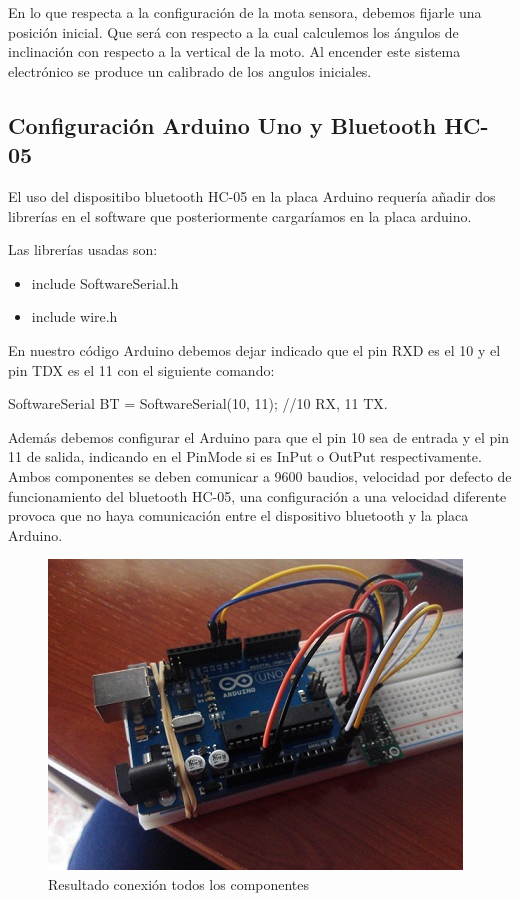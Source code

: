 			
			En lo que respecta a la configuración de la mota sensora, debemos fijarle una posición inicial. Que será con respecto a la cual calculemos los ángulos de inclinación con respecto a la vertical de la moto. Al encender este sistema electrónico se produce un calibrado de los angulos iniciales. 
			
		
		\subsection{Configuración Arduino Uno y Bluetooth HC-05}
	
			El uso del dispositibo bluetooth HC-05 en la placa Arduino requería a\~nadir dos librerías en el software que posteriormente cargaríamos en la placa arduino.
			
			Las librerías usadas son:
			
			\begin{itemize}	
				
				\item include SoftwareSerial.h
				
				\item include wire.h
				
			\end{itemize}
			
			En nuestro código Arduino debemos dejar indicado que el pin RXD es el 10 y el pin TDX es el 11 con el siguiente comando:
			
			SoftwareSerial BT = SoftwareSerial(10, 11); //10 RX, 11 TX.
			
			Además debemos configurar el Arduino para que el pin 10 sea de entrada y el pin 11 de salida, indicando en el PinMode si es InPut o OutPut respectivamente. Ambos componentes se deben comunicar a 9600 baudios, velocidad por defecto de funcionamiento del bluetooth HC-05, una configuración a una velocidad diferente provoca que no haya comunicación entre el dispositivo bluetooth y la placa Arduino.
			
			\begin{figure}[h]
				\centering
				\includegraphics{imagenes/implementacion.jpg}
				\caption{Resultado conexión todos los componentes}
				\label{contexto:figura}
			\end{figure}
			
